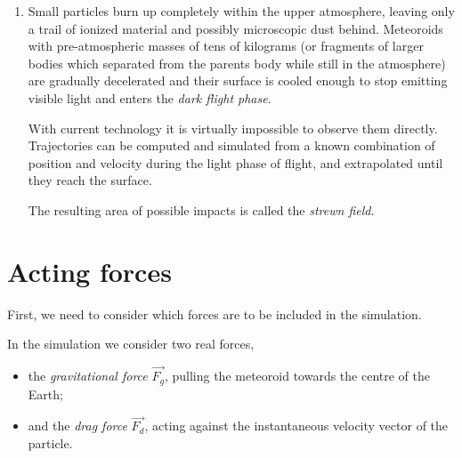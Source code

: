 \begin{enumerate}
                The density of the atmosphere at this altitude presents significant drag.


                dynamical pressure may exceed the toughness of the particle,
                so fragmentation is also possible. Peak brightness

                For more massive meteoroids (masses on the order of kilograms to tons) the light phase often continues
                to below \SI{50}{\kilo\metre} or even lower. Very dense and solid meteoroids or small asteroids
                it is possible not to be slowed down and impact the surface at hypersonic speeds,
                emitting light until the last moment.

            \item
                Small particles burn up completely within the upper atmosphere,
                leaving only a trail of ionized material and possibly microscopic dust behind.
                Meteoroids with pre-atmospheric masses of tens of kilograms (or fragments
                of larger bodies which separated from the parents body while still in the atmosphere)
                are gradually decelerated and their surface is cooled enough
                to stop emitting visible light and enters the \emph{dark flight phase}.

                With current technology it is virtually impossible to observe them directly.
                Trajectories can be computed and simulated from a known combination
                of position and velocity during the light phase of flight, and extrapolated
                until they reach the surface.

                The resulting area of possible impacts is called the \emph{strewn field}.
        \end{enumerate}


\section{Acting forces} \label{df}
    First, we need to consider which forces are to be included in the simulation.

    In the simulation we consider two real forces,
    \begin{itemize}
        \item the \emph{gravitational force} $\vec{F_g}$, pulling the meteoroid towards the centre of the Earth;
        \item and the \emph{drag force} $\vec{F_d}$, acting against the instantaneous velocity vector of the particle.
    \end{itemize}

